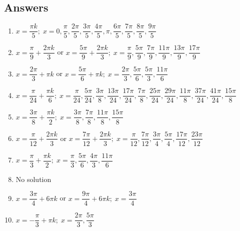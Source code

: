 \newpage

\subsection{Answers}

\begin{enumerate}

\item $x = \dfrac{\pi k}{5}; \; x = 0, \dfrac{\pi}{5}, \dfrac{2\pi}{5}, \dfrac{3\pi}{5}, \dfrac{4\pi}{5}, \pi, \dfrac{6\pi}{5}, \dfrac{7\pi}{5}, \dfrac{8\pi}{5}, \dfrac{9\pi}{5}$

\item $x = \dfrac{\pi}{9} + \dfrac{2\pi k}{3}$ or $x = \dfrac{5\pi}{9} + \dfrac{2\pi k}{3}; \; x = \dfrac{\pi}{9}, \dfrac{5\pi}{9}, \dfrac{7\pi}{9}, \dfrac{11\pi}{9}, \dfrac{13\pi}{9}, \dfrac{17\pi}{9}$

\item $x = \dfrac{2\pi}{3} + \pi k$ or $x = \dfrac{5\pi}{6} + \pi k; \; x = \dfrac{2\pi}{3}, \dfrac{5\pi}{6}, \dfrac{5\pi}{3}, \dfrac{11\pi}{6}$

\item $x = \dfrac{\pi}{24} + \dfrac{\pi k}{6}; \; x = \dfrac{\pi}{24}, \dfrac{5\pi}{24}, \dfrac{3\pi}{8}, \dfrac{13\pi}{24}, \dfrac{17\pi}{24}, \dfrac{7\pi}{8}, \dfrac{25\pi}{24}, \dfrac{29\pi}{24}, \dfrac{11\pi}{8}, \dfrac{37\pi}{24}, \dfrac{41\pi}{24}, \dfrac{15\pi}{8}$

\item $x = \dfrac{3\pi}{8} + \dfrac{\pi k}{2}; \; x = \dfrac{3\pi}{8}, \dfrac{7\pi}{8}, \dfrac{11\pi}{8}, \dfrac{15\pi}{8}$

\item $x = \dfrac{\pi}{12} + \dfrac{2\pi k}{3}$ or $x = \dfrac{7\pi}{12} + \dfrac{2\pi k}{3}; \; x = \dfrac{\pi}{12}, \dfrac{7\pi}{12}, \dfrac{3\pi}{4}, \dfrac{5\pi}{4}, \dfrac{17\pi}{12}, \dfrac{23\pi}{12}$

\item $x = \dfrac{\pi}{3} + \dfrac{\pi k}{2}; \; x = \dfrac{\pi}{3}, \dfrac{5\pi}{6}, \dfrac{4\pi}{3}, \dfrac{11\pi}{6}$

\item No solution

\item $x = \dfrac{3\pi}{4} + 6\pi k$ or $x = \dfrac{9\pi}{4} + 6\pi k; \; x = \dfrac{3\pi}{4}$

\item $x = -\dfrac{\pi}{3} + \pi k; \; x = \dfrac{2\pi}{3}, \dfrac{5\pi}{3}$


\end{enumerate}
